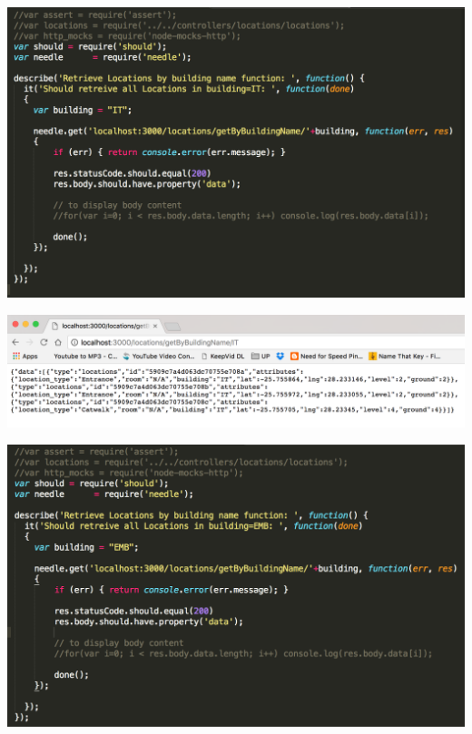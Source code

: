 \documentclass[runningheads,a4paper]{article}
\begin{document}
	\begin{center}
	\begin{minipage}{0.48\linewidth}
		\includegraphics[width=\linewidth]{fig/IT-test.png}
	\end{minipage}
	\hfill
	\begin{minipage}{0.48\linewidth}
		\includegraphics[width=\linewidth]{fig/Result-IT.png}
	\end{minipage}
\hfill
	\begin{minipage}{0.49\linewidth}
		\includegraphics[width=\linewidth]{fig/EMB-test.png}

\end{minipage}
\end{center}
\end{document}

